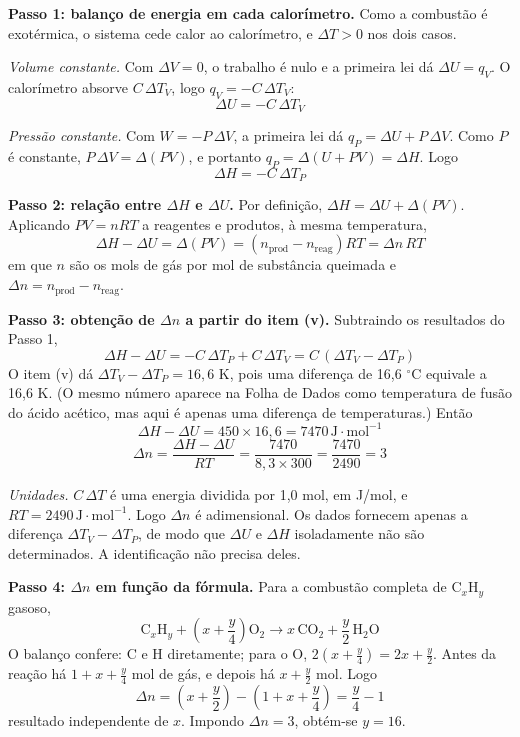 \documentclass{article}%
\begin{document}
\textbf{Passo 1: balanço de energia em cada calorímetro.} Como a combustão é exotérmica, o sistema cede calor ao calorímetro, e $\Delta T>0$ nos dois casos.

\emph{Volume constante.} Com $\Delta V=0$, o trabalho é nulo e a primeira lei dá $\Delta U=q_V$. O calorímetro absorve $C\,\Delta T_V$, logo $q_V=-C\,\Delta T_V$:
\[ \Delta U=-C\,\Delta T_V \]

\emph{Pressão constante.} Com $W=-P\,\Delta V$, a primeira lei dá $q_P=\Delta U+P\,\Delta V$. Como $P$ é constante, $P\,\Delta V=\Delta(PV)$, e portanto $q_P=\Delta(U+PV)=\Delta H$. Logo
\[ \Delta H=-C\,\Delta T_P \]

\textbf{Passo 2: relação entre $\Delta H$ e $\Delta U$.} Por definição, $\Delta H=\Delta U+\Delta(PV)$. Aplicando $PV=nRT$ a reagentes e produtos, à mesma temperatura,
\[ \Delta H-\Delta U=\Delta(PV)=\left(n_{\text{prod}}-n_{\text{reag}}\right)RT=\Delta n\,RT \]
em que $n$ são os mols de gás por mol de substância queimada e $\Delta n=n_{\text{prod}}-n_{\text{reag}}$.

\textbf{Passo 3: obtenção de $\Delta n$ a partir do item (v).} Subtraindo os resultados do Passo 1,
\[ \Delta H-\Delta U=-C\,\Delta T_P+C\,\Delta T_V=C\,(\Delta T_V-\Delta T_P) \]
O item (v) dá $\Delta T_V-\Delta T_P=16{,}6$ K, pois uma diferença de 16,6 $^{\circ}$C equivale a 16,6 K. (O mesmo número aparece na Folha de Dados como temperatura de fusão do ácido acético, mas aqui é apenas uma diferença de temperaturas.) Então
\[ \Delta H-\Delta U=450\times 16{,}6=7470\,\text{J}\cdot\text{mol}^{-1} \]
\[ \Delta n=\frac{\Delta H-\Delta U}{RT}=\frac{7470}{8{,}3\times 300}=\frac{7470}{2490}=3 \]

\emph{Unidades.} $C\,\Delta T$ é uma energia dividida por 1,0 mol, em J/mol, e $RT=2490\,\text{J}\cdot\text{mol}^{-1}$. Logo $\Delta n$ é adimensional. Os dados fornecem apenas a diferença $\Delta T_V-\Delta T_P$, de modo que $\Delta U$ e $\Delta H$ isoladamente não são determinados. A identificação não precisa deles.

\textbf{Passo 4: $\Delta n$ em função da fórmula.} Para a combustão completa de $\text{C}_x\text{H}_y$ gasoso,
\[ \text{C}_x\text{H}_y+\left(x+\frac{y}{4}\right)\text{O}_2\longrightarrow x\,\text{CO}_2+\frac{y}{2}\,\text{H}_2\text{O} \]
O balanço confere: C e H diretamente; para o O, $2\left(x+\frac{y}{4}\right)=2x+\frac{y}{2}$. Antes da reação há $1+x+\frac{y}{4}$ mol de gás, e depois há $x+\frac{y}{2}$ mol. Logo
\[ \Delta n=\left(x+\frac{y}{2}\right)-\left(1+x+\frac{y}{4}\right)=\frac{y}{4}-1 \]
resultado independente de $x$. Impondo $\Delta n=3$, obtém-se $y=16$.
\end{document}

